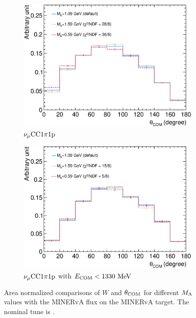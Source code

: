 \begin{figure}
     \\
     \begin{subfigure}[b]{\dbfigwid\textwidth}
          \centering
          \includegraphics[width=\textwidth]{figures/COM/anorm-ma-minerva-600k-_da_tan.eps}
          \caption{$\nu_{\mu}\textrm{CC}1\pi1\textrm{p}$}
          \label{subfig:ma-comp-minerva}
     \end{subfigure}
     \begin{subfigure}[b]{\dbfigwid\textwidth}
          \centering
          \includegraphics[width=\textwidth]{figures/COM/anorm-ma-minerva-600k-wcut_da_tan.eps}
          \caption{$\nu_{\mu}\textrm{CC}1\pi1\textrm{p}$ with $E_{\textrm{COM}}<1330~\textrm{MeV}$}
          \label{subfig:ma-comp-minerva-wcut}
     \end{subfigure}
     \caption{Area normalized comparisons of $W$ and $\theta_{\textrm{COM}}$ for different $M_{\textrm{A}}$ values with the MINERvA flux on the MINERvA target. The nominal tune is \gZero.}
     \label{fig:ma-comp-minerva}
     \end{figure}

